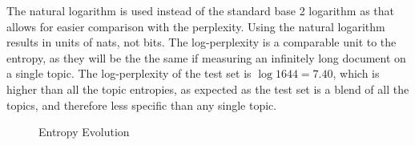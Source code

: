 \documentclass[11pt]{amsart}
\begin{document}
The natural logarithm is used instead of the standard base 2 logarithm as that allows for easier comparison with the perplexity. Using the natural logarithm results in units of nats, not bits. The log-perplexity is a comparable unit to the entropy, as they will be the the same if measuring an infinitely long document on a single topic. The log-perplexity of the test set is $\log1644= 7.40$, which is higher than all the topic entropies, as expected as the test set is a blend of all the topics, and therefore less specific than any single topic.
\begin{figure}[h]
    \centering
    \caption{Entropy Evolution} \label{fig:e_entropies}
\end{figure}



\end{document}

